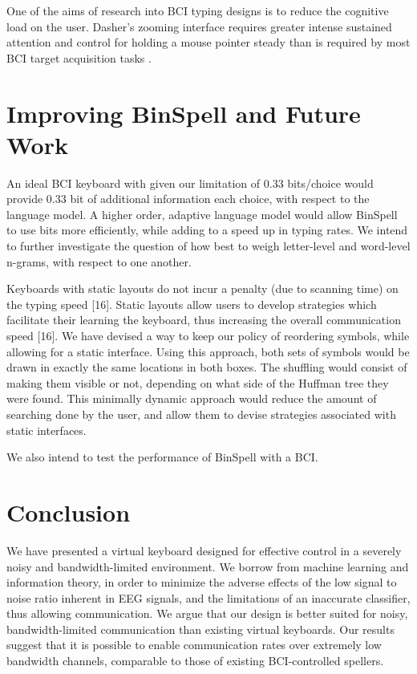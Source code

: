 \documentclass[12pt,titlepage]{article}
\begin{document}
One of the aims of research into BCI typing designs is to reduce the cognitive load on the user.  Dasher's zooming interface requires greater intense sustained attention and control for 
holding a mouse pointer steady than is required by most BCI target acquisition tasks \cite{felton2007neural}.

\section{Improving BinSpell and Future Work}

An ideal BCI keyboard with given our limitation of 0.33 bits/choice would provide 0.33 bit of 
additional information each choice, with respect to the language model.  A higher order, adaptive 
language model would allow BinSpell to use bits more efficiently, while adding to a speed up in typing 
rates.  We intend to further investigate the question of how best to weigh letter-level and word-level n-grams, with respect to one another. 

Keyboards with static layouts do not incur a penalty (due to scanning time) on the typing speed [16]. 
Static layouts allow users to develop strategies which facilitate their learning the keyboard, thus 
increasing the overall communication speed [16].  We have devised a way to keep our policy of 
reordering symbols, while allowing for a static interface.  Using this approach, both sets of symbols 
would be drawn in exactly the same locations in both boxes.  The  shuffling would consist of making 
them visible or not, depending on what side of the Huffman tree they were found.  This minimally 
dynamic approach would reduce the amount of searching done by the user, and allow them to devise 
strategies associated with static interfaces. 

We also intend to test the performance of BinSpell with a BCI.

\section{Conclusion}

We have presented a virtual keyboard designed for effective control in a severely noisy and
bandwidth-limited environment.  We borrow from machine learning and  information theory, in 
order to minimize the adverse effects of the low signal to noise ratio inherent in EEG signals, 
and the limitations of an inaccurate classifier, thus allowing communication.  We argue that our 
design is better suited for noisy, bandwidth-limited communication than existing virtual 
keyboards. Our results suggest that it is possible to enable communication rates over extremely 
low bandwidth channels, comparable to those of existing BCI-controlled spellers.



\end{document}
